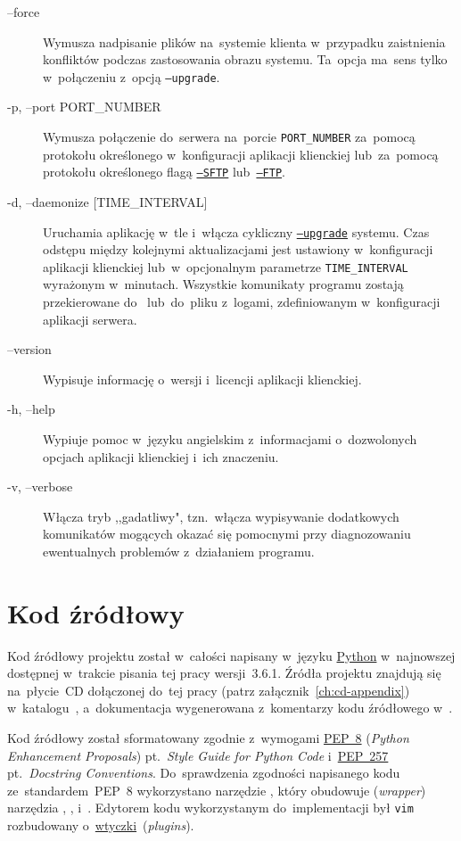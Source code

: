 \documentclass[thesis]{subfiles}
\begin{document}
\begin{description}
	\item[--force] Wymusza nadpisanie plików na~systemie klienta w~przypadku zaistnienia konfliktów podczas zastosowania obrazu systemu. Ta~opcja ma~sens tylko w~połączeniu z~opcją \texttt{--upgrade}.
	\item[-p, --port PORT\_NUMBER] Wymusza połączenie do~serwera na~porcie \texttt{PORT\_NUMBER} za~pomocą protokołu określonego w~konfiguracji aplikacji klienckiej lub~za~pomocą protokołu określonego flagą \hyperlink{itm:cli-sftp}{\texttt{--SFTP}} lub~\hyperlink{itm:cli-sftp}{\texttt{--FTP}}.
	\item[-d, --daemonize {[TIME\_INTERVAL]}] Uruchamia aplikację w~tle i~włącza cykliczny \hyperlink{itm:cli-upgrade}{\texttt{--upgrade}} systemu. Czas odstępu między kolejnymi aktualizacjami jest ustawiony w~konfiguracji aplikacji klienckiej lub~w~opcjonalnym parametrze \texttt{TIME\_INTERVAL} wyrażonym w~minutach. Wszystkie komunikaty programu zostają przekierowane do~ lub~do~pliku z~logami, zdefiniowanym w~konfiguracji aplikacji serwera.
	\item[--version] Wypisuje informację o~wersji i~licencji aplikacji klienckiej.
	\item[-h, --help] Wypiuje pomoc w~języku angielskim z~informacjami o~dozwolonych opcjach aplikacji klienckiej i~ich znaczeniu.
	\item[-v, --verbose] Włącza tryb ,,gadatliwy", tzn.~włącza wypisywanie dodatkowych komunikatów mogących okazać się pomocnymi przy diagnozowaniu ewentualnych problemów z~działaniem programu.
\end{description}


\section{Kod źródłowy}

Kod źródłowy projektu został w~całości napisany w~języku \href{https://en.wikipedia.org/wiki/Python_(programming_language)}{Python} w~najnowszej dostępnej w~trakcie pisania tej pracy wersji~3.6.1. Źródła projektu znajdują się na~płycie~CD dołączonej do~tej pracy (patrz załącznik~\ref{ch:cd-appendix}) w~katalogu~, a~dokumentacja wygenerowana z~komentarzy kodu źródłowego w~.

Kod źródłowy został sformatowany zgodnie z~wymogami \href{https://www.python.org/dev/peps/pep-0008/}{PEP~8} (\emph{Python Enhancement Proposals}) pt.~\emph{Style Guide for Python Code} i~\href{https://www.python.org/dev/peps/pep-0257/}{PEP~257} pt.~\emph{Docstring Conventions}. Do~sprawdzenia zgodności napisanego kodu ze~standardem~PEP~8 wykorzystano narzędzie , który obudowuje (\emph{wrapper}) narzędzia , ,  i~. Edytorem kodu wykorzystanym do~implementacji był \texttt{vim} rozbudowany o~\href{http://vimawesome.com/}{wtyczki}~(\emph{plugins}).
\end{document}
